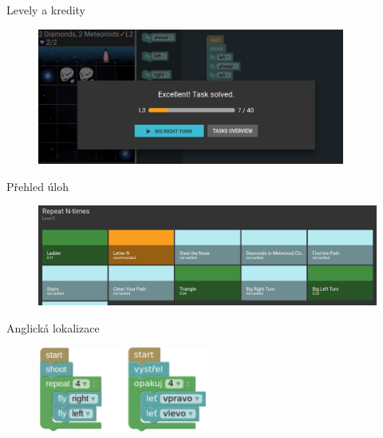 \documentclass[
]{beamer}
\begin{document}
\begin{frame}{Levely a kredity}
\begin{figure}
\includegraphics[width=0.9\textwidth,height=.65\textheight,keepaspectratio]{../img/robomission-levels-credits}
\end{figure}
\end{frame}

\begin{frame}{Přehled úloh}
\begin{figure}
\includegraphics[width=\textwidth,height=.75\textheight,keepaspectratio]{../img/robomission-tasks-overview}
\end{figure}
\end{frame}

\begin{frame}{Anglická lokalizace}
\begin{figure}
\includegraphics[width=0.5\textwidth,height=.75\textheight,keepaspectratio]{../img/roboblocks-english-czech}
\end{figure}
\end{frame}
\end{document}
